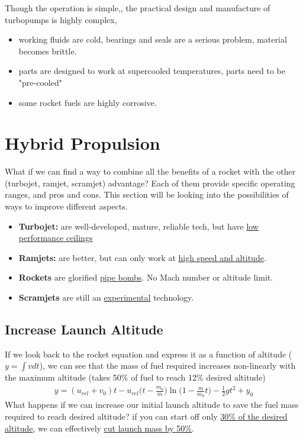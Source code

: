 \documentclass[a4paper,10pt]{article}
\begin{document}
Though the operation is simple,, the practical design and manufacture of turbopumps is highly complex,
\begin{itemize}
    \item working fluids are cold, bearings and seals are a serious problem, material becomes brittle.
    \item parts are designed to work at supercooled temperatures, parts need to be "pre-cooled"
    \item some rocket fuels are highly corrosive. 
\end{itemize}



\newpage
\section{Hybrid Propulsion}
What if we can find a way to combine all the benefits of a rocket with the other (turbojet, ramjet, scramjet) advantage? Each of them provide specific operating ranges, and pros and cons. This section will be looking into the possibilities of ways to improve different aspects.
\begin{itemize}
    \item \textbf{Turbojet:} are well-developed, mature, reliable tech, but have \underline{low performance ceilings}
    \item \textbf{Ramjets:} are better, but can only work at \underline{high speed and altitude}. 
    \item \textbf{Rockets} are glorified \underline{pipe bombs}. No Mach number or altitude limit. 
    \item \textbf{Scramjets} are still an \underline{experimental} technology.
\end{itemize}

\subsection{Increase Launch Altitude}
If we look back to the rocket equation and express it as a function of altitude ($y=\int vdt$), we can see that the mass of fuel required increases non-linearly with the maximum altitude (takes 50\% of fuel to reach 12\% desired altitude)
\begin{gather*}
    y = (u_{rel}+v_0)t-u_{rel}\Bigg(t-\frac{m_0}{\dot{m}}\Bigg)\ln\Bigg(1-\frac{\dot{m}}{m_0}t\Bigg)-\frac{1}{2}gt^2+y_0
\end{gather*}
What happens if we can increase our initial launch altitude to save the fuel mass required to reach desired altitude? if you can start off only \underline{30\% of the desired altitude}, we can effectively \underline{cut launch mass by 50\%}.
\end{document}
